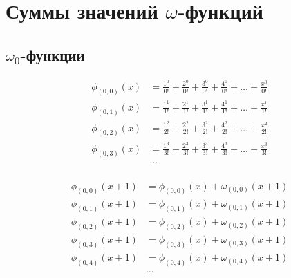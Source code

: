 
\section{Суммы значений $\omega$-функций}

\subsection{$\omega_0$-функции}

\begin{equation*} \begin{aligned}
\phi_{(0,0)}(x) &=
  \frac{1^0}{0!} 
+ \frac{2^0}{0!} 
+ \frac{3^0}{0!} 
+ \frac{4^0}{0!} 
+ \ldots 
+ \frac{x^0}{0!} \\
%
\phi_{(0,1)}(x) &= 
  \frac{1^1}{1!} 
+ \frac{2^1}{1!} 
+ \frac{3^1}{1!} 
+ \frac{4^1}{1!} 
+ \ldots 
+ \frac{x^1}{1!} \\
%
\phi_{(0,2)}(x) &= 
  \frac{1^2}{2!} 
+ \frac{2^2}{2!} 
+ \frac{3^2}{2!} 
+ \frac{4^2}{2!} 
+ \ldots 
+ \frac{x^2}{2!} \\
%
\phi_{(0,3)}(x) &= 
  \frac{1^3}{3!} 
+ \frac{2^3}{3!} 
+ \frac{3^3}{3!} 
+ \frac{4^3}{3!} 
+ \ldots 
+ \frac{x^3}{3!} \\
%
&\ldots \\
\end{aligned} \end{equation*}

\begin{equation*} \begin{aligned}
\phi_{(0,0)}(x + 1) &= 
  \phi_{(0,0)}(x) + \omega_{(0,0)}(x + 1)
\\
\phi_{(0,1)}(x + 1) &= 
  \phi_{(0,1)}(x) + \omega_{(0,1)}(x + 1)  
\\
\phi_{(0,2)}(x + 1) &= 
  \phi_{(0,2)}(x) + \omega_{(0,2)}(x + 1)  
\\
\phi_{(0,3)}(x + 1) &= 
  \phi_{(0,3)}(x) + \omega_{(0,3)}(x + 1)  
\\
\phi_{(0,4)}(x + 1) &= 
  \phi_{(0,4)}(x) + \omega_{(0,4)}(x + 1)  
\\
&\ldots \\
\end{aligned} \end{equation*}

